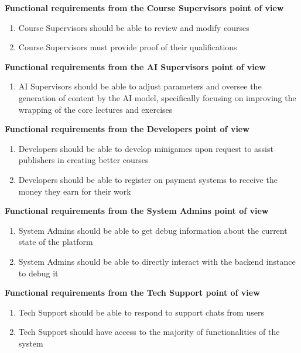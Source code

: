 \textbf{Functional requirements from the Course Supervisors point of view}
\begin{enumerate}[start=22,label={\bfseries FR \arabic*.}]
	\item Course Supervisors should be able to review and modify courses
	\item Course Supervisors must provide proof of their qualifications
\end{enumerate}

\textbf{Functional requirements from the AI Supervisors point of view}
\begin{enumerate}[start=24,label={\bfseries FR \arabic*.}]
	\item AI Supervisors should be able to adjust parameters and oversee the generation of content by the AI model, specifically focusing on improving the wrapping of the core lectures and exercises
\end{enumerate}

\textbf{Functional requirements from the Developers point of view}
\begin{enumerate}[start=25,label={\bfseries FR \arabic*.}]
	\item Developers should be able to develop minigames upon request to assist publishers in creating better courses
	\item Developers should be able to register on payment systems to receive the money they earn for their work
\end{enumerate}

\textbf{Functional requirements from the System Admins point of view}
\begin{enumerate}[start=27,label={\bfseries FR \arabic*.}]
	\item System Admins should be able to get debug information about the current state of the platform
	\item System Admins should be able to directly interact with the backend instance to debug it
\end{enumerate}

\textbf{Functional requirements from the Tech Support point of view}
\begin{enumerate}[start=29,label={\bfseries FR \arabic*.}]
	\item Tech Support should be able to respond to support chats from users
	\item Tech Support should have access to the majority of functionalities of the system
\end{enumerate}

